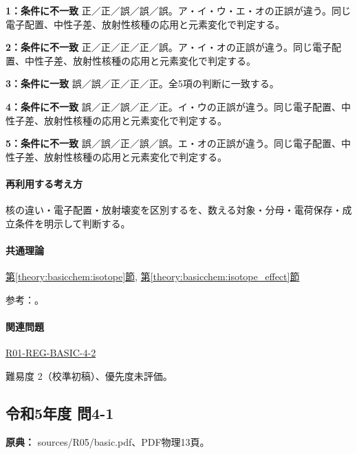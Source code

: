 \noindent\textbf{1：条件に不一致} 正／正／誤／誤／誤。ア・イ・ウ・エ・オの正誤が違う。同じ電子配置、中性子差、放射性核種の応用と元素変化で判定する。\par

\noindent\textbf{2：条件に不一致} 正／正／正／正／誤。ア・イ・オの正誤が違う。同じ電子配置、中性子差、放射性核種の応用と元素変化で判定する。\par

\noindent\textbf{3：条件に一致} 誤／誤／正／正／正。全5項の判断に一致する。\par

\noindent\textbf{4：条件に不一致} 誤／正／誤／正／正。イ・ウの正誤が違う。同じ電子配置、中性子差、放射性核種の応用と元素変化で判定する。\par

\noindent\textbf{5：条件に不一致} 誤／誤／正／誤／誤。エ・オの正誤が違う。同じ電子配置、中性子差、放射性核種の応用と元素変化で判定する。\par

\paragraph{再利用する考え方} 核の違い・電子配置・放射壊変を区別するを、数える対象・分母・電荷保存・成立条件を明示して判断する。

\paragraph{共通理論} \hyperref[theory:basicchem:isotope]{第\ref*{theory:basicchem:isotope}節}, \hyperref[theory:basicchem:isotope_effect]{第\ref*{theory:basicchem:isotope_effect}節}

\par 参考：\cite{iupac_isotopes,iupac_isotope_effect}。

\paragraph{関連問題} \hyperref[q:r01-reg-basic-4-2]{R01-REG-BASIC-4-2}

\par 難易度 2（校準初稿）、優先度未評価。

\subsection{令和5年度 問4-1}
\label{q:r05-reg-basic-4-1}

\noindent\textbf{原典：} sources/R05/basic.pdf、PDF物理13頁。

